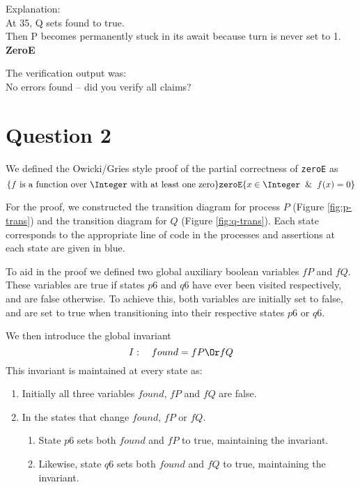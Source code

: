 \documentclass[12pt,a4paper]{scrartcl}
\begin{document}
Explanation:\\
At 35, Q sets found to true. \\
Then P becomes permanently stuck in its await because turn is never set to 1.\\

\textbf{ZeroE}

The verification output was:\\
No errors found -- did you verify all claims?

\section{Question 2}
We defined the Owicki/Gries style proof of the partial correctness of \texttt{zeroE} as
\begin{equation}
    \{ \textrm{$f$ is a function over $\Integer$ with at least one zero} \}
    \texttt{zeroE}
    \{ x \in \Integer \And f(x)=0 \}
\label{eq:og-proof}
\end{equation}

For the proof, we constructed the transition diagram for process $P$ (Figure \ref{fig:p-trans}) and the transition diagram for $Q$ (Figure \ref{fig:q-trans}).
Each state corresponds to the appropriate line of code in the processes and assertions at each state are given in blue.

To aid in the proof we defined two global auxiliary boolean variables $fP$ and $fQ$.
These variables are true if states $p6$ and $q6$ have ever been visited respectively, and are false otherwise.
To achieve this, both variables are initially set to false, and are set to true when transitioning into their respective states $p6$ or $q6$.

We then introduce the global invariant
\begin{equation}
    I: \quad found = fP \Or fQ
\label{eq:og-invariant}
\end{equation}
This invariant is maintained at every state as:
\begin{enumerate}
    \item Initially all three variables $found$, $fP$ and $fQ$ are false.
    \item In the states that change $found$, $fP$ or $fQ$.
    \begin{enumerate}
        \item State $p6$ sets both $found$ and $fP$ to true, maintaining the invariant.
        \item Likewise, state $q6$ sets both $found$ and $fQ$ to true, maintaining the invariant.
    \end{enumerate}
\end{enumerate}
\end{document}
